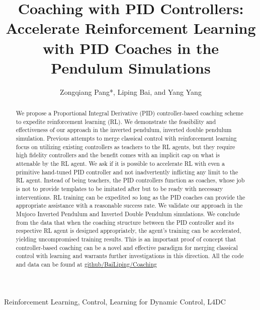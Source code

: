 \documentclass{IJCAS}
\begin{document}

\title{Coaching with PID Controllers: Accelerate Reinforcement Learning with PID Coaches in the Pendulum Simulations}

\author{Zongqiang Pang*\orcid{}, Liping Bai\orcid{}, and Yang Yang\orcid{}
}%

\begin{abstract}
We propose a Proportional Integral Derivative (PID) controller-based coaching scheme to expedite reinforcement learning (RL). We demonstrate the feasibility and effectiveness of our approach in the inverted pendulum, inverted double pendulum simulation. Previous attempts to merge classical control with reinforcement learning focus on utilizing existing controllers as teachers to the RL agents, but they require high fidelity controllers and the benefit comes with an implicit cap on what is attenable by the RL agent. We ask if it is possible to accelerate RL with even a primitive hand-tuned PID controller and not inadvertently inflicting any limit to the RL agent. Instead of being teachers, the PID controllers function as coaches, whose job is not to provide templates to be imitated after but to be ready with necessary interventions. RL training can be expedited so long as the PID coaches can provide the appropriate assistance with a reasonable success rate. We validate our approach in the Mujoco Inverted Pendulum and Inverted Double Pendulum simulations. We conclude from the data that when the coaching structure between the PID controller and its respective RL agent is designed appropriately, the agent's training can be accelerated, yielding uncompromised training results. This is an important proof of concept that controller-based coaching can be a novel and effective paradigm for merging classical control with learning and warrants further investigations in this direction. All the code and data can be found at \href{https://github.com/BaiLiping/Coaching}{github/BaiLiping/Coaching}
\end{abstract}

\begin{keywords}
Reinforcement Learning, Control, Learning for Dynamic Control, L4DC
\end{keywords}

\maketitle
\end{document}
